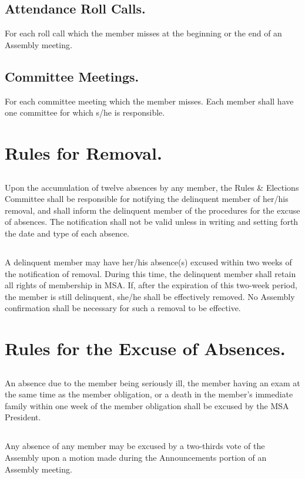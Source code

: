 \documentclass{rules}
\begin{document}
\subsection{Attendance Roll Calls.}
For each roll call which the member misses at the beginning or the end of an Assembly meeting.
\subsection{Committee Meetings.}
For each committee meeting which the member misses. Each member shall have one committee for which s/he is responsible.

\section{Rules for Removal.}
\subsection{}
Upon the accumulation of twelve absences by any member, the Rules \& Elections Committee shall be responsible for notifying the delinquent member of her/his removal, and shall inform the delinquent member of the procedures for the excuse of absences.  The notification shall not be valid unless in writing and setting forth the date and type of each absence.
\subsection{}
A delinquent member may have her/his absence(s) excused within two weeks of the notification of removal.  During this time, the delinquent member shall retain all rights of membership in MSA.  If, after the expiration of this two-week period, the member is still delinquent, she/he shall be effectively removed.  No Assembly confirmation shall be necessary for such a removal to be effective.

\section{Rules for the Excuse of Absences.}
\subsection{}
An absence due to the member being seriously ill, the member having an exam at the same time as the member obligation, or a death in the member's immediate family within one week of the member obligation shall be excused by the MSA President.
\subsection{}
Any absence of any member may be excused by a two-thirds vote of the Assembly upon a motion made during the Announcements portion of an Assembly meeting.
\end{document}
